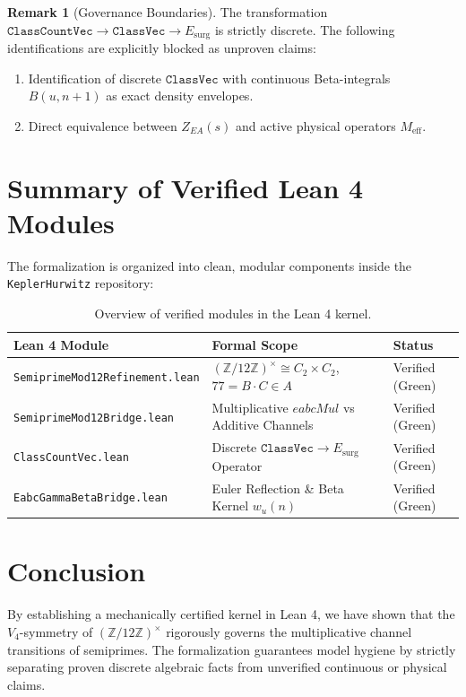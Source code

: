 \documentclass[11pt,a4paper]{article}
\theoremstyle{definition}
\newtheorem{remark}[theorem]{Remark}
\begin{document}
	\begin{remark}[Governance Boundaries]
		The transformation $\mathtt{ClassCountVec} \to \mathtt{ClassVec} \to E_{\mathrm{surg}}$ is strictly discrete. The following identifications are explicitly blocked as unproven claims:
		\begin{enumerate}
			\item Identification of discrete $\mathtt{ClassVec}$ with continuous Beta-integrals $B(u, n+1)$ as exact density envelopes.
			\item Direct equivalence between $Z_{EA}(s)$ and active physical operators $M_{\mathrm{eff}}$.
		\end{enumerate}
	\end{remark}
	
	\section{Summary of Verified Lean 4 Modules}
	
	The formalization is organized into clean, modular components inside the \texttt{KeplerHurwitz} repository:
	
	\begin{table}[h]
		\centering
		\small
		\begin{tabular}{lll}
			\toprule
			\textbf{Lean 4 Module} & \textbf{Formal Scope} & \textbf{Status} \\
			\midrule
			\texttt{SemiprimeMod12Refinement.lean} & $(\mathbb{Z}/12\mathbb{Z})^\times \cong C_2 \times C_2$, $77 = B \cdot C \in A$ & Verified (Green) \\
			\texttt{SemiprimeMod12Bridge.lean} & Multiplicative $eabcMul$ vs Additive Channels & Verified (Green) \\
			\texttt{ClassCountVec.lean} & Discrete $\mathtt{ClassVec} \to E_{\mathrm{surg}}$ Operator & Verified (Green) \\
			\texttt{EabcGammaBetaBridge.lean} & Euler Reflection \& Beta Kernel $w_u(n)$ & Verified (Green) \\
			\bottomrule
		\end{tabular}
		\caption{Overview of verified modules in the Lean 4 kernel.}
	\end{table}
	
	\section{Conclusion}
	
	By establishing a mechanically certified kernel in Lean 4, we have shown that the $V_4$-symmetry of $(\mathbb{Z}/12\mathbb{Z})^\times$ rigorously governs the multiplicative channel transitions of semiprimes. The formalization guarantees model hygiene by strictly separating proven discrete algebraic facts from unverified continuous or physical claims.
	
\end{document}
